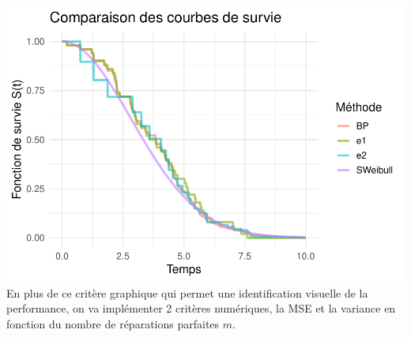 \documentclass[
]{article}
\begin{document}
\includegraphics{Projet-Poisson_files/figure-latex/Comparaison_visuelle-1.pdf}
En plus de ce critère graphique qui permet une identification visuelle
de la performance, on va implémenter 2 critères numériques, la MSE et la
variance en fonction du nombre de réparations parfaites \(m\).
\end{document}
